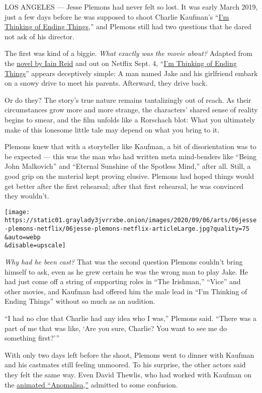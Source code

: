 LOS ANGELES --- Jesse Plemons had never felt so lost. It was early March
2019, just a few days before he was supposed to shoot Charlie Kaufman's
``\href{https://www.netflix.com/title/80211559}{I'm Thinking of Ending
Things},'' and Plemons still had two questions that he dared not ask of
his director.

The first was kind of a biggie. \emph{What exactly was the movie about?}
Adapted from the
\href{https://www.nytimes3xbfgragh.onion/2016/09/04/books/review/im-thinking-of-ending-things-iain-reid.html}{novel
by Iain Reid} and out on Netflix Sept. 4,
``\href{https://www.nytimes3xbfgragh.onion/2020/09/01/movies/im-thinking-of-ending-things-review.html}{I'm
Thinking of Ending Things}'' appears deceptively simple: A man named
Jake and his girlfriend embark on a snowy drive to meet his parents.
Afterward, they drive back.

Or do they? The story's true nature remains tantalizingly out of reach.
As their circumstances grow more and more strange, the characters'
shared sense of reality begins to smear, and the film unfolds like a
Rorschach blot: What you ultimately make of this lonesome little tale
may depend on what you bring to it.

Plemons knew that with a storyteller like Kaufman, a bit of
disorientation was to be expected --- this was the man who had written
meta mind-benders like ``Being John Malkovich'' and ``Eternal Sunshine
of the Spotless Mind,'' after all. Still, a good grip on the material
kept proving elusive. Plemons had hoped things would get better after
the first rehearsal; after that first rehearsal, he was convinced they
wouldn't.

\texttt{[image: https://static01.graylady3jvrrxbe.onion/images/2020/09/06/arts/06jesse-plemons-netflix/06jesse-plemons-netflix-articleLarge.jpg?quality=75\\\&auto=webp\\\&disable=upscale]}

\emph{Why had he been cast?} That was the second question Plemons
couldn't bring himself to ask, even as he grew certain he was the wrong
man to play Jake. He had just come off a string of supporting roles in
``The Irishman,'' ``Vice'' and other movies, and Kaufman had offered him
the male lead in ``I'm Thinking of Ending Things'' without so much as an
audition.

``I had no clue that Charlie had any idea who I was,'' Plemons said.
``There was a part of me that was like, `Are you sure, Charlie? You want
to see me do something first?'''

With only two days left before the shoot, Plemons went to dinner with
Kaufman and his castmates still feeling unmoored. To his surprise, the
other actors said they felt the same way. Even David Thewlis, who had
worked with Kaufman on the
\href{https://www.nytimes3xbfgragh.onion/2015/12/30/movies/review-anomalisa-pairs-charlie-kaufman-and-lonely-puppets.html}{animated
``Anomalisa,''} admitted to some confusion.

